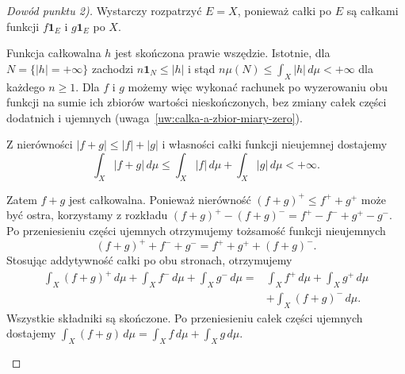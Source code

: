 \begin{proof}[Dowód punktu 2)]
Wystarczy rozpatrzyć $E=X$, ponieważ całki po $E$ są całkami funkcji
$f\mathbf{1}_E$ i $g\mathbf{1}_E$ po $X$.

Funkcja całkowalna $h$ jest skończona prawie wszędzie. Istotnie, dla
$N=\{|h|=+\infty\}$ zachodzi $n\mathbf{1}_N\leq|h|$ i stąd
$n\mu(N)\leq\int_X|h|\,d\mu<+\infty$ dla każdego $n\geq1$.
Dla $f$ i $g$ możemy więc wykonać rachunek po wyzerowaniu obu funkcji
na sumie ich zbiorów wartości nieskończonych, bez zmiany całek części
dodatnich i ujemnych (uwaga~\ref{uw:calka-a-zbior-miary-zero}).

Z nierówności $|f+g|\leq |f|+|g|$ i własności całki funkcji
nieujemnej dostajemy
\[
  \int_X|f+g|\,d\mu
  \leq\int_X|f|\,d\mu+\int_X|g|\,d\mu<+\infty.
\]
\begin{samepage}
Zatem $f+g$ jest całkowalna. Ponieważ nierówność $(f+g)^+\leq f^++g^+$
może być ostra, korzystamy z rozkładu
$(f+g)^+-(f+g)^-=f^+-f^-+g^+-g^-$. Po przeniesieniu części ujemnych
otrzymujemy tożsamość funkcji nieujemnych
\[
  (f+g)^+ + f^- + g^- = f^+ + g^+ + (f+g)^-.
\]
Stosując addytywność całki po obu stronach, otrzymujemy
\begin{align*}
  \int_X(f+g)^+\,d\mu+\int_X f^-\,d\mu+\int_X g^-\,d\mu
  ={}&\int_X f^+\,d\mu+\int_X g^+\,d\mu\\
    &+\int_X(f+g)^-\,d\mu.
\end{align*}
Wszystkie składniki są skończone. Po przeniesieniu całek części
ujemnych dostajemy $\int_X(f+g)\,d\mu=\int_X f\,d\mu+\int_X g\,d\mu$.
\end{samepage}
\end{proof}
